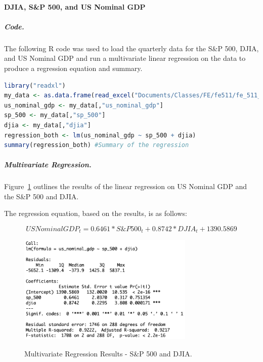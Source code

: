\documentclass[11pt]{article}
\numberwithin{equation}{section}
\begin{document}
\paragraph{DJIA, S\&P 500, and US Nominal GDP}

\subparagraph{Code.}
The following R code was used to load the quarterly data for the S\&P 500, DJIA, and US Nominal GDP and run a multivariate linear regression on the data to produce a regression equation and summary.

\vspace{3mm}
\begin{lstlisting}[language=R]
library("readxl")
my_data <- as.data.frame(read_excel("Documents/Classes/FE/fe511/fe_511_final_project/fe_511_data.xlsx"))
us_nominal_gdp <- my_data[,"us_nominal_gdp"]
sp_500 <- my_data[,"sp_500"]
djia <- my_data[,"djia"]
regression_both <- lm(us_nominal_gdp ~ sp_500 + djia)
summary(regression_both) #Summary of the regression
\end{lstlisting}
\vspace{3mm}

\subparagraph{Multivariate Regression.}
Figure~\ref{fig:model3} outlines the results of the linear regression on US Nominal GDP and the S\&P 500 and DJIA.

The regression equation, based on the results, is as follows:

\[ US Nominal GDP_{t} = 0.6461*S\&P500_{t} + 0.8742*DJIA_{t} + 1390.5869 \]

\begin{figure}
	\begin{center}
		{\includegraphics[width=0.75\textwidth]{regression_results_both.png}}
	\end{center}
	\caption{Multivariate Regression Results - S\&P 500 and DJIA.}
	\label{fig:model3}
\end{figure}
\end{document}
